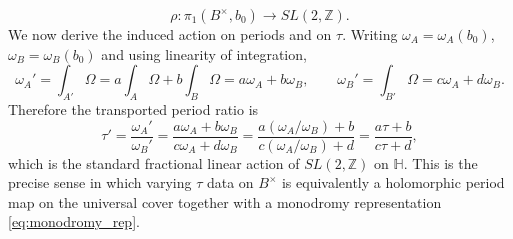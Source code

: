 \documentclass[11pt]{article}
\theoremstyle{remark}
\begin{document}
\begin{equation}\label{eq:monodromy_rep}
\rho:\pi_1(B^\times,b_0)\longrightarrow SL(2,\mathbb{Z}).
\end{equation}
We now derive the induced action on periods and on $\tau$. Writing $\omega_A=\omega_A(b_0)$, $\omega_B=\omega_B(b_0)$ and using linearity of integration,
\begin{equation}\label{eq:period_transform}
\omega_A'=\int_{A'}\Omega=a\int_A\Omega+b\int_B\Omega=a\omega_A+b\omega_B,\qquad \omega_B'=\int_{B'}\Omega=c\omega_A+d\omega_B.
\end{equation}
Therefore the transported period ratio is
\begin{equation}\label{eq:tau_transform}
\tau'=\frac{\omega_A'}{\omega_B'}=\frac{a\omega_A+b\omega_B}{c\omega_A+d\omega_B}=\frac{a(\omega_A/\omega_B)+b}{c(\omega_A/\omega_B)+d}=\frac{a\tau+b}{c\tau+d},
\end{equation}
which is the standard fractional linear action of $SL(2,\mathbb{Z})$ on $\mathbb{H}$. This is the precise sense in which varying $\tau$ data on $B^\times$ is equivalently a holomorphic period map on the universal cover together with a monodromy representation \eqref{eq:monodromy_rep}.
\end{document}
